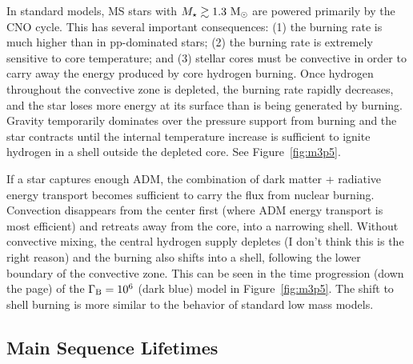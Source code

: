 \documentclass[useAMS,usenatbib]{mnras}
\begin{document}
In standard models, MS stars with $M_{\star} \gtrsim 1.3 \ \mathrm{M}_{\odot}$ are powered primarily by the CNO cycle.
This has several important consequences:
(1) the burning rate is much higher than in pp-dominated stars;
(2) the burning rate is extremely sensitive to core temperature;
and (3) stellar cores must be convective in order to carry away the energy produced by core hydrogen burning.
Once hydrogen throughout the convective zone is depleted, the burning rate rapidly decreases, and the star loses more energy at its surface than is being generated by burning. Gravity temporarily dominates over the pressure support from burning and the star contracts until the internal temperature increase is sufficient to ignite hydrogen in a shell outside the depleted core. See Figure~\ref{fig:m3p5}.

If a star captures enough ADM, the combination of dark matter + radiative energy transport becomes sufficient to carry the flux from nuclear burning. Convection disappears from the center first (where ADM energy transport is most efficient) and retreats away from the core, into a narrowing shell. Without convective mixing, the central hydrogen supply depletes (I don't think this is the right reason) and the burning also shifts into a shell, following the lower boundary of the convective zone. This can be seen in the time progression (down the page) of the $\Gamma_\mathrm{B} = 10^{6}$ (dark blue) model in Figure~\ref{fig:m3p5}. The shift to shell burning is more similar to the behavior of standard low mass models.


\subsection{Main Sequence Lifetimes}
\label{sub:mstau}
\end{document}
